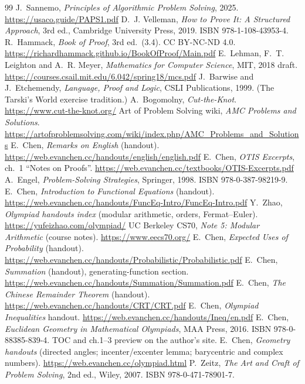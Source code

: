 \begin{thebibliography}{99}
 J.~Sannemo, \emph{Principles of Algorithmic Problem Solving}, 2025. \url{https://usaco.guide/PAPS1.pdf}
 D.~J. Velleman, \emph{How to Prove It: A Structured Approach}, 3rd ed., Cambridge University Press, 2019. ISBN 978-1-108-43953-4.
 R.~Hammack, \emph{Book of Proof}, 3rd ed.~(3.4). CC BY-NC-ND 4.0. \url{https://richardhammack.github.io/BookOfProof/Main.pdf}
 E.~Lehman, F.~T. Leighton and A.~R. Meyer, \emph{Mathematics for Computer Science}, MIT, 2018 draft. \url{https://courses.csail.mit.edu/6.042/spring18/mcs.pdf}
 J.~Barwise and J.~Etchemendy, \emph{Language, Proof and Logic}, CSLI Publications, 1999. (The Tarski's World exercise tradition.)
 A.~Bogomolny, \emph{Cut-the-Knot}. \url{https://www.cut-the-knot.org/}
 Art of Problem Solving wiki, \emph{AMC Problems and Solutions}. \url{https://artofproblemsolving.com/wiki/index.php/AMC_Problems_and_Solutions}
 E.~Chen, \emph{Remarks on English} (handout). \url{https://web.evanchen.cc/handouts/english/english.pdf}
 E.~Chen, \emph{OTIS Excerpts}, ch.~1 ``Notes on Proofs''. \url{https://web.evanchen.cc/textbooks/OTIS-Excerpts.pdf}
 A.~Engel, \emph{Problem-Solving Strategies}, Springer, 1998. ISBN 978-0-387-98219-9.
 E.~Chen, \emph{Introduction to Functional Equations} (handout). \url{https://web.evanchen.cc/handouts/FuncEq-Intro/FuncEq-Intro.pdf}
 Y.~Zhao, \emph{Olympiad handouts index} (modular arithmetic, orders, Fermat--Euler). \url{https://yufeizhao.com/olympiad/}
 UC Berkeley CS70, \emph{Note 5: Modular Arithmetic} (course notes). \url{https://www.eecs70.org/}
 E.~Chen, \emph{Expected Uses of Probability} (handout). \url{https://web.evanchen.cc/handouts/Probabilistic/Probabilistic.pdf}
 E.~Chen, \emph{Summation} (handout), generating-function section. \url{https://web.evanchen.cc/handouts/Summation/Summation.pdf}
 E.~Chen, \emph{The Chinese Remainder Theorem} (handout). \url{https://web.evanchen.cc/handouts/CRT/CRT.pdf}
 E.~Chen, \emph{Olympiad Inequalities} handout. \url{https://web.evanchen.cc/handouts/Ineq/en.pdf}
 E.~Chen, \emph{Euclidean Geometry in Mathematical Olympiads}, MAA Press, 2016. ISBN 978-0-88385-839-4. TOC and ch.1--3 preview on the author's site.
 E.~Chen, \emph{Geometry handouts} (directed angles; incenter/excenter lemma; barycentric and complex numbers). \url{https://web.evanchen.cc/olympiad.html}
 P.~Zeitz, \emph{The Art and Craft of Problem Solving}, 2nd ed., Wiley, 2007. ISBN 978-0-471-78901-7.
\end{thebibliography}
